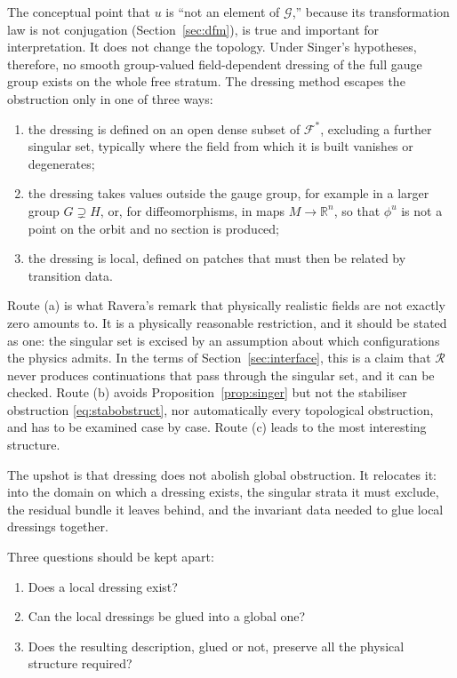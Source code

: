 \documentclass[11pt]{article}
\theoremstyle{plain}
\theoremstyle{definition}
\theoremstyle{remark}
\newcommand{\F}{\mathcal F}
\newcommand{\G}{\mathcal G}
\newcommand{\R}{\mathcal R}
\begin{document}
The conceptual point that $u$ is ``not an element of $\G$,'' because its transformation law is not conjugation (Section~\ref{sec:dfm}), is true and important for interpretation. It does not change the topology. Under Singer's hypotheses, therefore, no smooth group-valued field-dependent dressing of the full gauge group exists on the whole free stratum. The dressing method escapes the obstruction only in one of three ways:
\begin{enumerate}[label=(\alph*)]
\item the dressing is defined on an open dense subset of $\F^*$, excluding a further singular set, typically where the field from which it is built vanishes or degenerates;
\item the dressing takes values outside the gauge group, for example in a larger group $G\supsetneq H$, or, for diffeomorphisms, in maps $M\to\mathbb R^n$, so that $\phi^u$ is not a point on the orbit and no section is produced;
\item the dressing is local, defined on patches that must then be related by transition data.
\end{enumerate}
Route (a) is what Ravera's remark that physically realistic fields are not exactly zero amounts to. It is a physically reasonable restriction, and it should be stated as one: the singular set is excised by an assumption about which configurations the physics admits. In the terms of Section~\ref{sec:interface}, this is a claim that $\R$ never produces continuations that pass through the singular set, and it can be checked. Route (b) avoids Proposition~\ref{prop:singer} but not the stabiliser obstruction \eqref{eq:stabobstruct}, nor automatically every topological obstruction, and has to be examined case by case. Route (c) leads to the most interesting structure.

The upshot is that dressing does not abolish global obstruction. It relocates it: into the domain on which a dressing exists, the singular strata it must exclude, the residual bundle it leaves behind, and the invariant data needed to glue local dressings together.

Three questions should be kept apart:
\begin{enumerate}[label=(\roman*)]
\item Does a local dressing exist?
\item Can the local dressings be glued into a global one?
\item Does the resulting description, glued or not, preserve all the physical structure required?
\end{enumerate}
\end{document}
